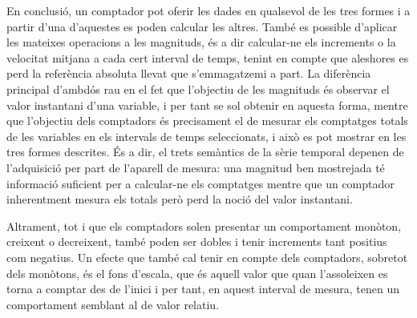 En conclusió, un comptador pot oferir les dades en qualsevol de les
tres formes i a partir d'una d'aquestes es poden calcular les
altres. També es possible d'aplicar les mateixes operacions a les
magnituds, és a dir calcular-ne els increments o la velocitat mitjana
a cada cert interval de temps, tenint en compte que aleshores es perd
la referència absoluta llevat que s'emmagatzemi a part. La diferència
principal d'ambdós rau en el fet que l'objectiu de les magnituds és
observar el valor instantani d'una variable, i per tant se sol obtenir
en aquesta forma, mentre que l'objectiu dels comptadors és precisament
el de mesurar els comptatges totals de les variables en els intervals
de temps seleccionats, i això es pot mostrar en les tres formes
descrites. És a dir, el trets semàntics de la sèrie temporal depenen
de l'adquisició per part de l'aparell de mesura: una magnitud ben
mostrejada té informació suficient per a calcular-ne els comptatges
mentre que un comptador inherentment mesura els totals però perd la
noció del valor instantani.


Altrament, tot i que els comptadors solen presentar un comportament
monòton, creixent o decreixent, també poden ser dobles i tenir
increments tant positius com negatius. Un efecte que també cal tenir
en compte dels comptadors, sobretot dels monòtons, és el fons
d'escala, que és aquell valor que quan l'assoleixen es torna a comptar
des de l'inici i per tant, en aquest interval de mesura, tenen un
comportament semblant al de valor relatiu.



